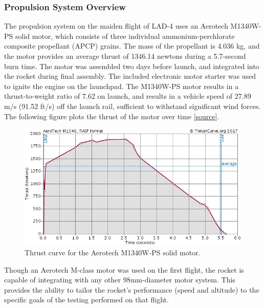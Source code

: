 \subsubsection{Propulsion System Overview}
The propulsion system on the maiden flight of LAD-4 uses an Aerotech M1340W-PS solid motor, which consists of three individual ammonium-perchlorate composite propellant (APCP) grains. The mass of the propellant is 4.036 kg, and the motor provides an average thrust of 1346.14 newtons during a 5.7-second burn time. The motor was assembled two days before launch, and integrated into the rocket during final assembly. The included electronic motor starter was used to ignite the engine on the launchpad. The M1340W-PS motor results in a thrust-to-weight ratio of 7.62 on launch, and results in a vehicle speed of 27.89 m/s (91.52 ft/s) off the launch rail, sufficient to withstand significant wind forces. 
\newline\newline
The following figure plots the thrust of the motor over time [\href{http://www.thrustcurve.org/}{source}].
\begin{figure}[H]
    \centering
    \includegraphics[scale=0.6]{imgs/thrustcurvesolid.png}
    \caption{Thrust curve for the Aerotech M1340W-PS solid motor.}
    \label{fig:thrustcurve}
\end{figure}
Though an Aerotech M-class motor was used on the first flight, the rocket is capable of integrating with any other 98mm-diameter motor system. This provides the ability to tailor the rocket’s performance (speed and altitude) to the specific goals of the testing performed on that flight. 
